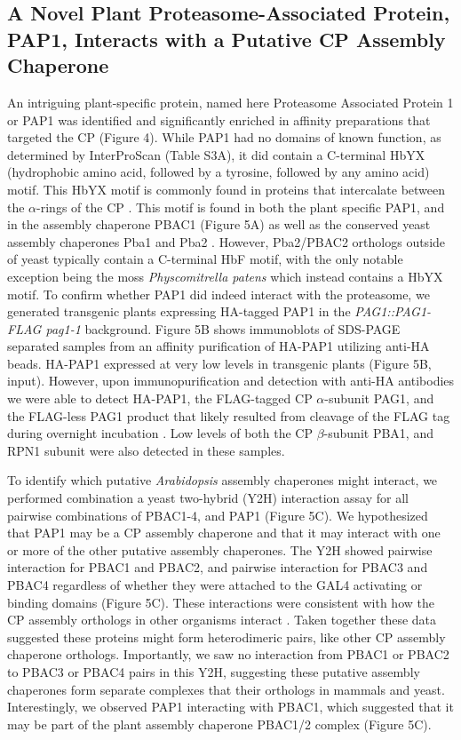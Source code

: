 \subsection{A Novel Plant Proteasome-Associated Protein, PAP1, Interacts with a Putative CP Assembly Chaperone}
An intriguing plant-specific protein, named here Proteasome Associated Protein 1 or PAP1 was identified and significantly enriched in affinity preparations that targeted the CP (Figure 4). While PAP1 had no domains of known function, as determined by InterProScan (Table S3A), it did contain a C-terminal HbYX (hydrophobic amino acid, followed by a tyrosine, followed by any amino acid) motif. This HbYX motif is commonly found in proteins that intercalate between the $\alpha$-rings of the CP \citep{kusmierczyk11}. This motif is found in both the plant specific PAP1, and in the assembly chaperone PBAC1 (Figure 5A) as well as the conserved yeast assembly chaperones Pba1 and Pba2 \citep{kusmierczyk11}. However, Pba2/PBAC2 orthologs outside of yeast typically contain a C-terminal HbF motif, with the only notable exception being the moss \textit{Physcomitrella patens} which instead contains a HbYX motif.   To confirm whether PAP1 did indeed interact with the proteasome, we generated transgenic plants expressing HA-tagged PAP1 in the \textit{PAG1::PAG1-FLAG pag1-1} background. Figure 5B shows immunoblots of SDS-PAGE separated samples from an affinity purification of HA-PAP1 utilizing anti-HA beads. HA-PAP1 expressed at very low levels in transgenic plants (Figure 5B, input). However, upon immunopurification and detection with anti-HA antibodies we were able to detect HA-PAP1, the FLAG-tagged CP $\alpha$-subunit PAG1, and the FLAG-less PAG1 product that likely resulted from cleavage of the FLAG tag during overnight incubation \citep{book10}. Low levels of both the CP $\beta$-subunit PBA1, and RPN1 subunit were also detected in these samples. 

To identify which putative \textit{Arabidopsis} assembly chaperones might interact, we performed combination a yeast two-hybrid (Y2H) interaction assay for all pairwise combinations of PBAC1-4, and PAP1 (Figure 5C). We hypothesized that PAP1 may be a CP assembly chaperone and that it may interact with one or more of the other putative assembly chaperones. The Y2H showed pairwise interaction for PBAC1 and PBAC2, and pairwise interaction for PBAC3 and PBAC4 regardless of whether they were attached to the GAL4 activating or binding domains (Figure 5C). These interactions were consistent with how the CP assembly orthologs in other organisms interact \citep{murata09}.  Taken together these data suggested these proteins might form heterodimeric pairs, like other CP assembly chaperone orthologs. Importantly, we saw no interaction from PBAC1 or PBAC2 to PBAC3 or PBAC4 pairs in this Y2H, suggesting these putative assembly chaperones form separate complexes that their orthologs in mammals and yeast. Interestingly, we observed PAP1 interacting with PBAC1, which suggested that it may be part of the plant assembly chaperone PBAC1/2 complex (Figure 5C). 

